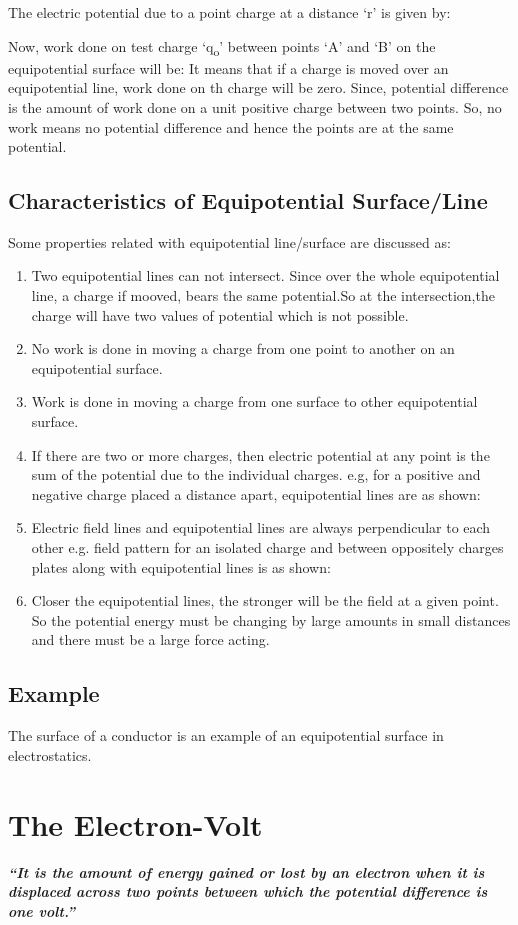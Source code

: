 The electric potential due to a
point charge at a distance ‘r’ is given by:


Now, work done on test charge ‘q\textsubscript{o}’ between points ‘A’ and
‘B’ on the equipotential surface will be:
It means that if a charge is moved over an equipotential line,
work done on th charge will be zero. Since, potential difference is the
amount of work done on a unit positive charge between two points. So,
no work means no potential difference and hence the points are at
the same potential.
\subsection{Characteristics of Equipotential Surface/Line}
Some properties related with equipotential line/surface are discussed as:
\begin{enumerate}[label = (\roman*)]
\item Two equipotential lines can not intersect.
Since over the whole equipotential line, a charge if mooved,
bears the same potential.So at the intersection,the charge
will have two values of potential which is not possible.
\item No work is done in moving a charge from one point to another on
an equipotential surface.
\item Work is done in moving a charge from one surface to other
equipotential surface.
\item If there are two or more charges, then electric potential at
any point is the sum of the potential due to the individual charges.
e.g, for a positive and negative charge placed a distance apart,
equipotential lines are as shown:
\item Electric field lines and equipotential lines are always 
perpendicular to each other e.g. field pattern for an isolated
charge and between oppositely charges plates along with equipotential
lines is as shown:
\item Closer the equipotential lines,
the stronger will be the field at a given point.
So the potential energy must be changing by large amounts in
small distances and there must be a large force acting.
\end{enumerate}
\subsection*{Example}
The surface of a conductor is an example of
an equipotential surface in electrostatics.
\section{The Electron-Volt}
\textit{\textbf{“It is the amount of energy gained or lost by an electron when it is displaced
across two points between which the potential difference is one volt.”}}
